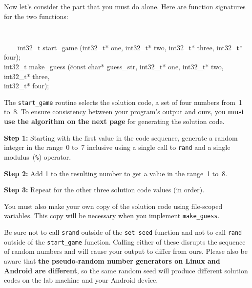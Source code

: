 \pagebreak

Now let's consider the part that you must do alone.
%
Here are function signatures for the two functions:\vspace{-8pt}

{\tt
\begin{tabbing}
~~~~\=int32\_t start\_game (int32\_t* one, int32\_t* two, int32\_t* three, int32\_t* four);\\
\>int32\_t make\_guess (\=const char* guess\_str, int32\_t* one, int32\_t* two, int32\_t* three,\\
\>\>int32\_t* four);
\end{tabbing}
}\vspace{-8pt}

The {\tt start\_game} routine selects the solution code, a set of four
numbers from~1 to~8.  To ensure consistency between your program's output
and ours, you {\bf must use the algorithm on the next page} for generating the
solution code.\vspace{-8pt}

\begin{list}{x}{\setlength{\leftmargin}{1.25in}\setlength{\rightmargin}{0.5in}\setlength{\labelwidth}{1in}\setlength{\itemsep}{0pt}\setlength{\parskip}{0pt}\setlength{\parsep}{0pt}}
\item[{\bf Step 1:}]{Starting with the first value in the code
sequence, generate a random integer in the range~0 to~7 inclusive
using a single call to {\tt rand} and a single modulus~({\tt \%}) operator.}
\item[{\bf Step 2:}]{Add 1 to the resulting number to get a value in the
range~1 to~8.}
\item[{\bf Step 3:}]{Repeat for the other three solution code 
values (in order).}
\end{list}\vspace{-8pt}

You must also make your own copy of the solution code using file-scoped
variables.  This copy will be necessary when you implement {\tt make\_guess}.

Be sure not to call {\tt srand} outside of the {\tt set\_seed} function
and not to call {\tt rand} outside of the {\tt start\_game} function.
Calling either of these disrupts the sequence of random numbers and will
cause your output to differ from ours.  Please also be aware that {\bf the
pseudo-random number generators on Linux and Android are different}, 
so the same 
random seed will produce different solution codes on the lab machine and 
your Android device.

